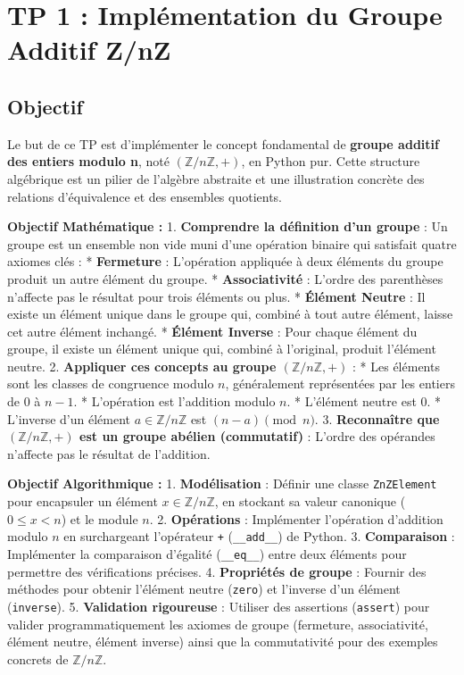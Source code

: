 \documentclass{report}
\begin{document}
\chapter*{TP 1 : Implémentation du Groupe Additif Z/nZ}

\section*{Objectif}
Le but de ce TP est d'implémenter le concept fondamental de \textbf{groupe additif des entiers modulo n}, noté $(\mathbb{Z}/n\mathbb{Z}, +)$, en Python pur. Cette structure algébrique est un pilier de l'algèbre abstraite et une illustration concrète des relations d'équivalence et des ensembles quotients.

\textbf{Objectif Mathématique :}
1.  \textbf{Comprendre la définition d'un groupe} : Un groupe est un ensemble non vide muni d'une opération binaire qui satisfait quatre axiomes clés :
    *   \textbf{Fermeture} : L'opération appliquée à deux éléments du groupe produit un autre élément du groupe.
    *   \textbf{Associativité} : L'ordre des parenthèses n'affecte pas le résultat pour trois éléments ou plus.
    *   \textbf{Élément Neutre} : Il existe un élément unique dans le groupe qui, combiné à tout autre élément, laisse cet autre élément inchangé.
    *   \textbf{Élément Inverse} : Pour chaque élément du groupe, il existe un élément unique qui, combiné à l'original, produit l'élément neutre.
2.  \textbf{Appliquer ces concepts au groupe $(\mathbb{Z}/n\mathbb{Z}, +)$} :
    *   Les éléments sont les classes de congruence modulo $n$, généralement représentées par les entiers de $0$ à $n-1$.
    *   L'opération est l'addition modulo $n$.
    *   L'élément neutre est $0$.
    *   L'inverse d'un élément $a \in \mathbb{Z}/n\mathbb{Z}$ est $(n-a) \pmod n$.
3.  \textbf{Reconnaître que $(\mathbb{Z}/n\mathbb{Z}, +)$ est un groupe abélien (commutatif)} : L'ordre des opérandes n'affecte pas le résultat de l'addition.

\textbf{Objectif Algorithmique :}
1.  \textbf{Modélisation} : Définir une classe \texttt{ZnZElement} pour encapsuler un élément $x \in \mathbb{Z}/n\mathbb{Z}$, en stockant sa valeur canonique ($0 \le x < n$) et le module $n$.
2.  \textbf{Opérations} : Implémenter l'opération d'addition modulo $n$ en surchargeant l'opérateur \texttt{+} (\texttt{\_\_add\_\_}) de Python.
3.  \textbf{Comparaison} : Implémenter la comparaison d'égalité (\texttt{\_\_eq\_\_}) entre deux éléments pour permettre des vérifications précises.
4.  \textbf{Propriétés de groupe} : Fournir des méthodes pour obtenir l'élément neutre (\texttt{zero}) et l'inverse d'un élément (\texttt{inverse}).
5.  \textbf{Validation rigoureuse} : Utiliser des assertions (\texttt{assert}) pour valider programmatiquement les axiomes de groupe (fermeture, associativité, élément neutre, élément inverse) ainsi que la commutativité pour des exemples concrets de $\mathbb{Z}/n\mathbb{Z}$.
\end{document}

